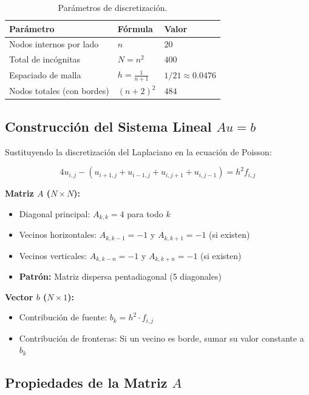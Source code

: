 \documentclass[12pt,a4paper]{article}
\theoremstyle{definition}
\begin{document}
\begin{table}[H]
\centering
\caption{Par\'{a}metros de discretizaci\'{o}n.}
\label{tab:discretizacion}
\begin{tabular}{@{}lll@{}}
\toprule
\textbf{Par\'{a}metro} & \textbf{F\'{o}rmula} & \textbf{Valor} \\ \midrule
Nodos internos por lado & $n$ & $20$ \\
Total de inc\'{o}gnitas & $N = n^2$ & $400$ \\
Espaciado de malla & $h = \frac{1}{n+1}$ & $1/21 \approx 0.0476$ \\
Nodos totales (con bordes) & $(n+2)^2$ & $484$ \\ \bottomrule
\end{tabular}
\end{table}

\subsection{Construcci\'{o}n del Sistema Lineal $Au = b$}

Sustituyendo la discretizaci\'{o}n del Laplaciano en la ecuaci\'{o}n de Poisson:

\begin{equation}\label{eq:sistema_discreto}
4u_{i,j} - (u_{i+1,j} + u_{i-1,j} + u_{i,j+1} + u_{i,j-1}) = h^2 f_{i,j}
\end{equation}

\textbf{Matriz $A$ ($N \times N$):}
\begin{itemize}
    \item Diagonal principal: $A_{k,k} = 4$ para todo $k$
    \item Vecinos horizontales: $A_{k, k-1} = -1$ y $A_{k, k+1} = -1$ (si existen)
    \item Vecinos verticales: $A_{k, k-n} = -1$ y $A_{k, k+n} = -1$ (si existen)
    \item \textbf{Patr\'{o}n:} Matriz dispersa pentadiagonal (5 diagonales)
\end{itemize}

\textbf{Vector $b$ ($N \times 1$):}
\begin{itemize}
    \item Contribuci\'{o}n de fuente: $b_k = h^2 \cdot f_{i,j}$
    \item Contribuci\'{o}n de fronteras: Si un vecino es borde, sumar su valor constante a $b_k$
\end{itemize}

\subsection{Propiedades de la Matriz $A$}
\end{document}
